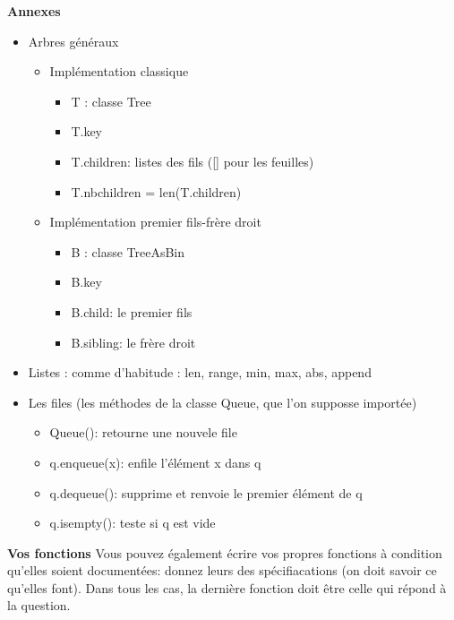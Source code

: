 \documentclass{article}
\begin{document}
\newpage
\noindent\textbf{Annexes}
\begin{itemize}
  \item Arbres généraux
  \begin{itemize}
    \item Implémentation classique
    \begin{itemize}
      \item T : classe Tree
      \item T.key
      \item T.children: listes des fils ([] pour les feuilles)
      \item T.nbchildren = len(T.children)
    \end{itemize}
    \item Implémentation premier fils-frère droit
    \begin{itemize}
      \item B : classe TreeAsBin
      \item B.key
      \item B.child: le premier fils
      \item B.sibling: le frère droit
    \end{itemize}
  \end{itemize}
  \item Listes : comme d'habitude : len, range, min, max, abs, append
  \item Les files (les méthodes de la classe Queue, que l'on supposse importée)
  \begin{itemize}
    \item Queue(): retourne une nouvele file
    \item q.enqueue(x): enfile l'élément x dans q
    \item q.dequeue(): supprime et renvoie le premier élément de q
    \item q.isempty(): teste si q est vide
  \end{itemize}
\end{itemize}

\textbf{Vos fonctions}\newline
\indent Vous pouvez également écrire vos propres fonctions à condition qu'elles soient documentées: donnez leurs des spécifiacations (on doit savoir ce qu'elles font).\newline
\indent Dans tous les cas, la dernière fonction doit être celle qui répond à la question.
\end{document}

